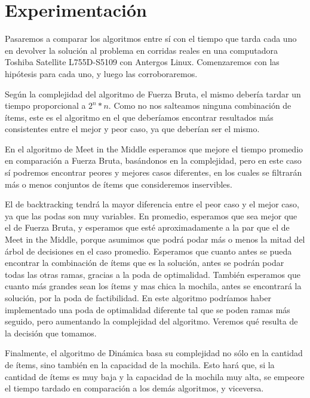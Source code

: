 \documentclass[10pt, a4paper]{article}
\begin{document}
\section{Experimentación}
Pasaremos a comparar los algoritmos entre sí con el tiempo que tarda cada uno en devolver la solución al problema en corridas reales en una computadora Toshiba Satellite L755D-S5109 con Antergos Linux. Comenzaremos con las hipótesis para cada uno, y luego las corroboraremos.\par
Según la complejidad del algoritmo de Fuerza Bruta, el mismo debería tardar un tiempo proporcional a $2^n * n$. Como no nos salteamos ninguna combinación de ítems, este es el algoritmo en el que deberíamos encontrar resultados más consistentes entre el mejor y peor caso, ya que deberían ser el mismo.\par
En el algoritmo de Meet in the Middle esperamos que mejore el tiempo promedio en comparación a Fuerza Bruta, basándonos en la complejidad, pero en este caso sí podremos encontrar peores y mejores casos diferentes, en los cuales se filtrarán más o menos conjuntos de ítems que consideremos inservibles.\par
El de backtracking tendrá la mayor diferencia entre el peor caso y el mejor caso, ya que las podas son muy variables. En promedio, esperamos que sea mejor que el de Fuerza Bruta, y esperamos que esté aproximadamente a la par que el de Meet in the Middle, porque asumimos que podrá podar más o menos la mitad del árbol de decisiones en el caso promedio. Esperamos que cuanto antes se pueda encontrar la combinación de ítems que es la solución, antes se podrán podar todas las otras ramas, gracias a la poda de optimalidad. También esperamos que cuanto más grandes sean los ítems y mas chica la mochila, antes se encontrará la solución, por la poda de factibilidad. En este algoritmo podríamos haber implementado una poda de optimalidad diferente tal que se poden ramas más seguido, pero aumentando la complejidad del algoritmo. Veremos qué resulta de la decisión que tomamos.\par
Finalmente, el algoritmo de Dinámica basa su complejidad no sólo en la cantidad de ítems, sino también en la capacidad de la mochila. Esto hará que, si la cantidad de ítems es muy baja y la capacidad de la mochila muy alta, se empeore el tiempo tardado en comparación a los demás algoritmos, y viceversa.\par
\end{document}
